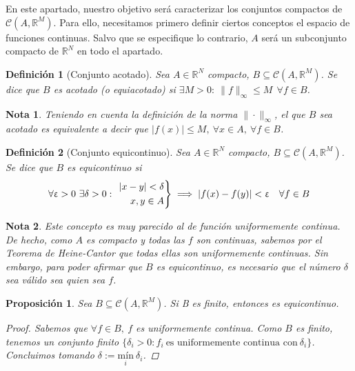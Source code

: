 \documentclass[11pt, a4paper]{article}
\let\epsilon\upvarepsilon
\theoremstyle{theorem-style}
\newtheorem{nprop}{Proposición}[section]
\theoremstyle{definition-style}
\newtheorem{ndef}{Definición}[section]
\theoremstyle{remark-style}
\newtheorem*{nota}{Nota}
\theoremstyle{example-style}
\newenvironment{rcases}
  {\left.\begin{aligned}}
  {\end{aligned}\right\rbrace}
\begin{document}
En este apartado, nuestro objetivo será caracterizar los conjuntos compactos de $\mathcal{C}(A,\mathbb{R}^M)$. Para ello, necesitamos primero definir ciertos conceptos el espacio de funciones continuas. Salvo que se especifique lo contrario, $A$ será un subconjunto compacto de $\mathbb{R}^N$ en todo el apartado.

\begin{ndef}[Conjunto acotado]
	Sea $A \in \mathbb{R}^N$ compacto, $B \subseteq \mathcal{C}(A,\mathbb{R}^M)$. Se dice que $B$ es acotado (o equiacotado) si $\exists M > 0: \ \|f\|_{\infty} \le M \ \ \forall f \in B$.
\end{ndef}

\begin{nota}
	Teniendo en cuenta la definición de la norma $\|\cdot\|_\infty$, el que $B$ sea acotado es equivalente a decir que $|f(x)|\le M,\ \forall x \in A,\ \forall f \in B$.
\end{nota}

\begin{ndef}[Conjunto equicontinuo]
    Sea $A \in \mathbb{R}^N$ compacto, $B \subseteq \mathcal{C}(A,\mathbb{R}^M)$. Se dice que $B$ es equicontinuo si $$\forall \epsilon > 0\ \exists \delta > 0:\ \begin{rcases} |x-y| < \delta\\ x,y \in A \end{rcases} \implies |f(x) - f(y)| < \epsilon \quad \forall f \in B$$
\end{ndef}

\begin{nota}
	Este concepto es muy parecido al de función uniformemente continua. De hecho, como $A$ es compacto y todas las $f$ son continuas, sabemos por el \textit{Teorema de Heine-Cantor} que todas ellas son uniformemente continuas. Sin embargo, para poder afirmar que $B$ es equicontinuo, es necesario que el número $\delta$ sea válido sea quien sea $f$. 
\end{nota}

\begin{nprop} Sea $B \subseteq \mathcal{C}(A,\mathbb{R}^M)$. Si B es finito, entonces es equicontinuo.

\begin{proof}
	Sabemos que $\forall f \in B,\ f$ es uniformemente continua. Como $B$ es finito, tenemos un conjunto finito $\{\delta_i > 0 : f_i \ \text{es uniformemente continua con} \ \delta_i\}$. Concluimos tomando $\delta := \underset{i}{\text{mín}} \ \delta_i$.
\end{proof}
\end{nprop}
\end{document}

